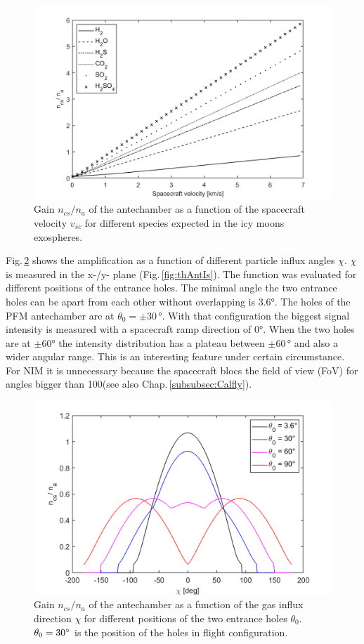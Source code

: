 	\begin{figure}[h!] %
		\centering
		\includegraphics[width= .8\textwidth]{Bilder/velocity.png}
		\caption{Gain $n_{cs}/n_a$ of the antechamber as a function of the spacecraft velocity $v_{sc}$ for different species expected in the icy moons exospheres.}
		\label{th:densEnhvelo}
	\end{figure}
	Fig.\,\ref{th:densEnhChiTheta} shows the amplification as a function of different particle influx angles $\chi$. $\chi$ is measured in the x-/y- plane (Fig.\,\ref{fig:thAntIs}). The function was evaluated for different positions of the entrance holes. The minimal angle the two entrance holes can be apart from each other without overlapping is 3.6\si{\degree}. The holes of the PFM antechamber are at $\theta_0 = \pm30\,\si{\degree}$. With that configuration the biggest signal intensity is measured with a spacecraft ramp direction of 0\si{\degree}. When the two holes are at $\pm$60\si{\degree} the intensity distribution has a plateau between $\pm$60\,\si{\degree} and also a wider angular range. This is an interesting feature under certain circumstance. For NIM it is unnecessary because the spacecraft blocs the field of view (FoV) for angles bigger than 100\degree (see also Chap.\,\ref{subsubsec:Calfly}).
	\begin{figure}[h!] %
		\centering
		\includegraphics[width= .8\textwidth]{Bilder/Chi_theta0.png}
		\caption{Gain $n_{cs}/n_a$ of the antechamber as a function of the gas influx direction $\chi$ for different positions of the two entrance holes $\theta_0$. $\theta_0=30^\circ$ is the position of the holes in flight configuration.}
		\label{th:densEnhChiTheta}
	\end{figure}
	
